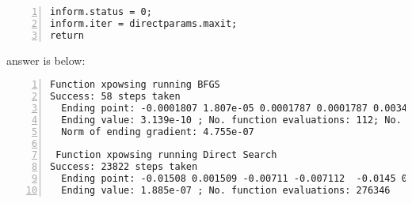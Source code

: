 \documentclass[12pt]{article}
\begin{document}
\begin{enumerate}
\begin{lstlisting}[language={[ANSI]C}, numbers=left, numberstyle=\tiny, frame=shadowbox, basicstyle=\ttfamily\small, showspaces=false, breaklines=true, showstringspaces=false, showtabs=false]
inform.status = 0;
inform.iter = directparams.maxit;
return
\end{lstlisting}

\bigskip

answer is below:

\begin{lstlisting}[language={[ANSI]C}, numbers=left, numberstyle=\tiny, frame=shadowbox, basicstyle=\ttfamily\small, showspaces=false, breaklines=true, showstringspaces=false, showtabs=false]
 Function xpowsing running BFGS
Success: 58 steps taken
  Ending point: -0.0001807 1.807e-05 0.0001787 0.0001787 0.003425 -0.0003425 0.001808 0.001808
  Ending value: 3.139e-10 ; No. function evaluations: 112; No. gradient evaluations 104
  Norm of ending gradient: 4.755e-07

 Function xpowsing running Direct Search
Success: 23822 steps taken
  Ending point: -0.01508 0.001509 -0.00711 -0.007112  -0.0145 0.001451 -0.006846 -0.006848
  Ending value: 1.885e-07 ; No. function evaluations: 276346
\end{lstlisting}



\end{enumerate}
\end{document}
